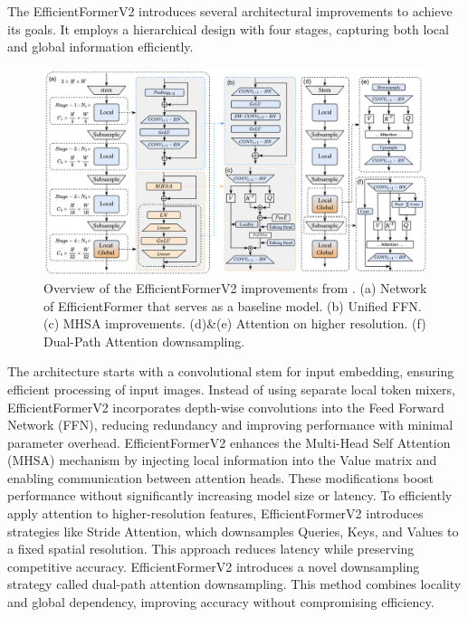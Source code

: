 \documentclass[a4paper,oneside]{article}
\begin{document}
The EfficientFormerV2 introduces several architectural improvements to achieve its goals.
It employs a hierarchical design with four stages, capturing both local and global information efficiently.

\begin{figure}[h]
  \includegraphics[width=\textwidth]{EfficientFormerV2.png}
  \centering
  \caption{Overview of the EfficientFormerV2 improvements from \citet{li2022rethinking}. (a) Network of EfficientFormer \citet{li2022efficientformer} that serves as a baseline model. (b) Unified FFN. (c) MHSA improvements. (d)\&(e) Attention on higher resolution. (f) Dual-Path Attention downsampling.}
  \centering
\end{figure}

The architecture starts with a convolutional stem for input embedding, ensuring efficient processing of input images.
Instead of using separate local token mixers, EfficientFormerV2 incorporates depth-wise convolutions into the Feed Forward Network (FFN), reducing redundancy and improving performance with minimal parameter overhead.
EfficientFormerV2 enhances the Multi-Head Self Attention (MHSA) mechanism by injecting local information into the Value matrix and enabling communication between attention heads.
These modifications boost performance without significantly increasing model size or latency.
To efficiently apply attention to higher-resolution features, EfficientFormerV2 introduces strategies like Stride Attention, which downsamples Queries, Keys, and Values to a fixed spatial resolution.
This approach reduces latency while preserving competitive accuracy.
EfficientFormerV2 introduces a novel downsampling strategy called dual-path attention downsampling.
This method combines locality and global dependency, improving accuracy without compromising efficiency.
\end{document}
